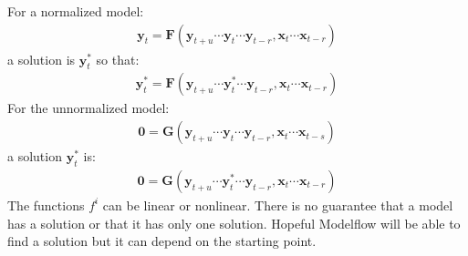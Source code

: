 \documentclass[letterpaper,10pt,english]{jupyterBook}
\begin{document}
\sphinxAtStartPar
For a normalized model:
\begin{equation*}
\begin{split}
\mathbf{y}_t  = \mathbf{F}(\mathbf{y}_{t+u} \cdots \mathbf{y}_t \cdots \mathbf{y}_{t-r},\mathbf{x}_t \cdots \mathbf{x}_{t-r})
\end{split}
\end{equation*}
\sphinxAtStartPar
a solution is  \(\mathbf{y}_t^{*}\) so that:
\begin{equation*}
\begin{split}
\mathbf{y}_t^* = \mathbf{F}(\mathbf{y}_{t+u} \cdots \mathbf{y}_t^* \cdots \mathbf{y}_{t-r},\mathbf{x}_t \cdots \mathbf{x}_{t-r})
\end{split}
\end{equation*}
\sphinxAtStartPar
For the un\sphinxhyphen{}normalized model:
\begin{equation*}
\begin{split}
\mathbf{0} = \mathbf{G}(\mathbf{y}_{t+u} \cdots \mathbf{y}_t \cdots \mathbf{y}_{t-r},\mathbf{x}_t \cdots \mathbf{x}_{t-s})
\end{split}
\end{equation*}
\sphinxAtStartPar
a solution \(\mathbf{y}_t^*\) is:
\begin{equation*}
\begin{split}
\mathbf{0} =\mathbf{G}(\mathbf{y}_{t+u} \cdots \mathbf{y}_t^* \cdots \mathbf{y}_{t-r},\mathbf{x}_t \cdots \mathbf{x}_{t-r})
\end{split}
\end{equation*}
\sphinxAtStartPar
The functions \(f^i\) can be linear or nonlinear. There is no guarantee that a model has a solution \sphinxhyphen{} or that it has only one solution. Hopeful Modelflow will be able to find a solution but it can depend on the starting point.
\end{document}
